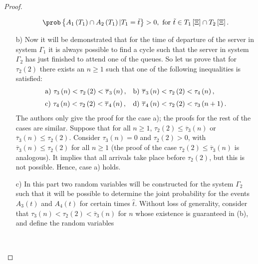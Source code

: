 \begin{proof}
\begin{itemize}
\begin{eqnarray}
\prob\left\{A_{1}\left(T_{1}\right)\cap A_{2}\left(T_{1}\right)|T_{1}=\tilde{t}\right\}>0,\textrm{ for }\tilde{t}\in T_{1}\left[\Xi\right]\cap T_{2}\left[\Xi\right].
\end{eqnarray}
\item[b) ] Now it will be demonstrated that for the time of departure of the server in system $\Gamma_{1}$ it is always possible to find a cycle such that the server in system $\Gamma_{2}$ has just finished to attend one of the queues. So let us prove that for $\tau_{2}\left(2\right)$ there exists an $n\geq1$ such that one of the following inequalities is satisfied:
\begin{eqnarray}\label{Eq.Casos.Ciclos}
\begin{array}{ll}\medskip
\textrm{a) }\tau_{3}\left(n\right)<\tau_{2}\left(2\right)
<\overline{\tau}_{3}\left(n\right),&
\textrm{b) }\overline{\tau}_{3}\left(n\right)<\tau_{2}\left(2\right)
<\tau_{4}\left(n\right),\\
\textrm{c) }\tau_{4}\left(n\right)<\tau_{2}\left(2\right)<
\overline{\tau}_{4}\left(n\right), &
\textrm{d) }\overline{\tau}_{4}\left(n\right)<\tau_{2}\left(2\right)
<\tau_{3}\left(n+1\right).
\end{array}
\end{eqnarray}
The authors only give the proof for the case a); the proofs for the rest of the cases are similar. 
Suppose that for all $n\geq1$, $\tau_{2}\left(2\right)\leq\overline{\tau}_{3}\left(n\right)$ or $\overline{\tau}_{3}\left(n\right)\leq\tau_{2}\left(2\right)$. Consider $\tau_{3}\left(n\right)=0$ and $\tau_{2}\left(2\right)>0$, with $\overline{\tau}_{3}\left(n\right)\leq\tau_{2}\left(2\right)$ for all $n\geq1$ (the proof of the case $\tau_{2}\left(2\right)\leq\overline{\tau}_{3}\left(n\right)$ is analogous). It implies that all arrivals take place before $\tau_{2}\left(2\right)$, but this is not possible. Hence, case a) holds.\medskip
\item[c) ] In this part two random variables will be constructed for the system $\Gamma_{2}$ such that it will be possible to determine the joint probability for the events $A_{3}\left(t\right)$ and $A_{4}\left(t\right)$ for certain times $\hat{t}$. Without loss of generality, consider that $\tau_{3}\left(n\right)<\tau_{2}\left(2\right)<\overline{\tau}_{3}\left(n\right)$ for $n$ whose existence is guaranteed in (b), and define the random variables
\begin{eqnarray}
\begin{array}{l}\medskip

\end{array}
\end{eqnarray}
\end{itemize}
\end{proof}
